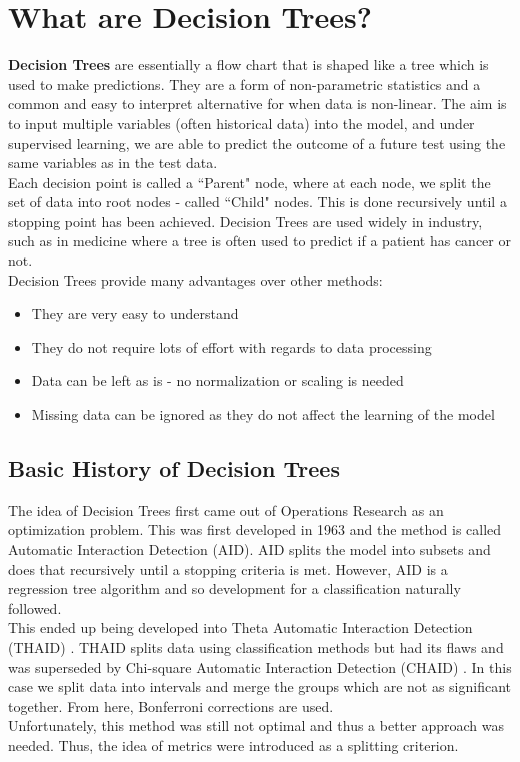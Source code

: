 \documentclass[11pt,a4paper]{report}
\begin{document}
\section{What are Decision Trees?}
\textbf{Decision Trees} are essentially a flow chart that is shaped like a tree which is used to make predictions. 
They are a form of non-parametric statistics and a common and easy to interpret alternative for when data is non-linear.
The aim is to input multiple variables (often historical data) into the model, and under supervised learning, we are able to predict the outcome of a future test using the same variables as in the test data.\\
Each decision point is called a ``Parent" node, where at each node, we split the set of data into root nodes - called ``Child" nodes.
This is done recursively until a stopping point has been achieved.
Decision Trees are used widely in industry, such as in medicine where a tree is often used to predict if a patient has cancer or not. 
\medskip\\
Decision Trees provide many advantages over other methods:
\begin{itemize}
    \item They are very easy to understand
    
    \item They do not require lots of effort with regards to data processing
    
    \item Data can be left as is - no normalization or scaling is needed
    
    \item Missing data can be ignored as they do not affect the learning of the model
\end{itemize}

\subsection{Basic History of Decision Trees \cite{50years}} 
The idea of Decision Trees first came out of Operations Research as an optimization problem. 
This was first developed in 1963 \cite{AID} and the method is called Automatic Interaction Detection (AID).
AID splits the model into subsets and does that recursively until a stopping criteria is met.
However, AID is a regression tree algorithm and so development for a classification naturally followed.
\medskip\\
This ended up being developed into Theta Automatic Interaction Detection (THAID) \cite{THAID}.
THAID splits data using classification methods but had its flaws and was superseded by Chi-square Automatic Interaction Detection (CHAID) \cite{CHAID}. 
In this case we split data into intervals and merge the groups which are not as significant together. From here, Bonferroni corrections are used.
\medskip\\
Unfortunately, this method was still not optimal and thus a better approach was needed.
Thus, the idea of metrics were introduced as a splitting criterion.
\end{document}
